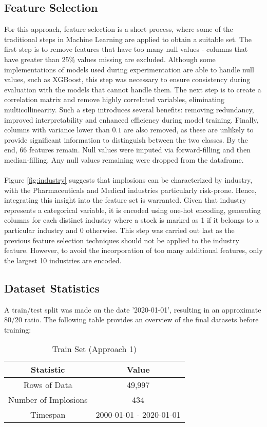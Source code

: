 \documentclass[a4paper]{report}
\begin{document}
\subsection{Feature Selection}
For this approach, feature selection is a short process, where some of the traditional steps in Machine Learning are applied to obtain a suitable set. The first step is 
to remove features that have too many null values - columns that have greater than 25\% values missing are excluded. Although some implementations of models used during experimentation 
are able to handle null values, such as XGBoost, this step was necessary to ensure consistency during evaluation with the models that cannot handle them. The next step is to create a correlation matrix 
and remove highly correlated variables, eliminating multicollinearity. Such a step introduces several benefits: removing redundancy, improved interpretability and enhanced efficiency
during model training. Finally, columns with variance lower than \(0.1\) are also removed, as these are unlikely to provide 
significant information to distinguish between the two classes. By the end, 66 features remain. Null values were imputed via forward-filling and then median-filling. Any 
null values remaining were dropped from the dataframe.\\\\Figure \ref{fig:industry} suggests that implosions can be characterized by industry, with the Pharmaceuticals and Medical industries particularly risk-prone. Hence, 
integrating this insight into the feature set is warranted. Given that industry represents a categorical variable, it is encoded using one-hot encoding, generating columns for each distinct industry where
a stock is marked as 1 if it belongs to a particular industry and 0 otherwise. This step was carried out last as the previous feature selection techniques 
should not be applied to the industry feature. However, to avoid the incorporation of too many additional features, only the largest 10 industries are encoded.

\subsection{Dataset Statistics}
A train/test split was made on the date '2020-01-01', resulting in an approximate 80/20 ratio. The following table provides an overview of the final datasets before training:
\begin{table}[htbp]
  \centering
  \begin{tabular}{|c|c|}
  \hline
  \textbf{Statistic} & \textbf{Value} \\
  \hline
  Rows of Data & 49,997 \\
  Number of Implosions & 434 \\
  Timespan & 2000-01-01 - 2020-01-01\\
  \hline
  \end{tabular}
  \caption{Train Set (Approach 1)}
  \label{tab:train_set_app1}
\end{table}
\end{document}
